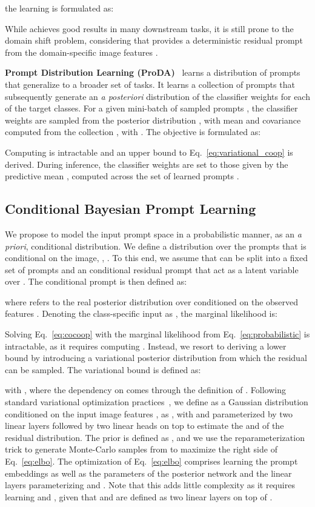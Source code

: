 \documentclass[10pt,twocolumn,letterpaper]{article}
\begin{document}
the learning is formulated as:

While \cocoop achieves good results in many downstream tasks, it is still prone to the domain shift problem, considering that  provides a deterministic residual prompt from the domain-specific image features .


\textbf{Prompt Distribution Learning (ProDA)}~\cite{lu2022prompt} learns a distribution of prompts that generalize to a broader set of tasks. It learns a collection of prompts  that subsequently generate an \textit{a posteriori} distribution of the classifier weights for each of the target classes. For a given mini-batch of  sampled prompts , the classifier weights  are sampled from the posterior distribution , with mean  and covariance  computed from the collection , with . The objective is formulated as: 

Computing  is intractable and an upper bound to Eq.~\ref{eq:variational_coop} is derived. During inference, the classifier weights are set to those given by the predictive mean , computed across the set of 
learned prompts . 



\subsection{Conditional Bayesian Prompt Learning}
\label{ssec:method_conditional}

We propose to model the input prompt space in a probabilistic manner, as an \textit{a priori}, conditional distribution. We define a distribution  over the prompts  that is conditional on the image, \ie, . To this end, we assume that  can be split into a fixed set of prompts  and an conditional residual prompt  that act as a latent variable over . The conditional prompt is then defined as:

 where  refers to the real posterior distribution over  conditioned on the observed features . Denoting the class-specific input as , the marginal likelihood  is:

Solving Eq.~\ref{eq:cocoop} with the marginal likelihood from Eq.~\ref{eq:probabilistic} is intractable, as it requires computing . Instead, we resort to deriving a lower bound by introducing a variational posterior distribution  from which the residual  can be sampled. The variational bound is defined as:

with , where the dependency on  comes through the definition of .  Following standard variational optimization practices~\cite{kingma2013auto,gordon2018metalearning}, we define  as a Gaussian distribution conditioned on the input image features , as , with  and  parameterized by two linear layers followed by two linear heads on top to estimate the  and  of the residual distribution. The prior  is defined as , and we use the reparameterization trick to generate Monte-Carlo samples from  to maximize the right side of Eq.~\ref{eq:elbo}. 
The optimization of Eq.~\ref{eq:elbo} comprises learning the prompt embeddings  as well as the parameters of the posterior network  and the linear layers parameterizing  and . Note that this adds little complexity as it requires learning  and , given that  and  are defined as two linear layers on top of .
\end{document}
